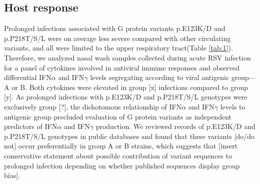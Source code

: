 \documentclass{article} %
\begin{document}
\subsection{Host response}
Prolonged infections associated with G protein variants p.E123K/D and p.P218T/S/L were on average less severe compared with other circulating variants, and all were limited to the upper respiratory tract(Table \ref{tab:1}). 
Therefore, we analyzed nasal wash samples collected during acute RSV infection for a panel of cytokines involved in antiviral immune responses and observed differential IFN$\alpha$ and IFN$\gamma$ levels segregating according to viral antigenic group—A or B.
Both cytokines were elevated in group [x] infections compared to group [y].
As prolonged infections with p.E123K/D and p.P218T/S/L genotypes were exclusively group [?], 
the dichotomous relationship of IFN$\alpha$ and IFN$\gamma$ levels to antigenic group precluded evaluation of G protein variants as independent predictors of IFN$\alpha$ and IFN$\gamma$ production. 
We reviewed records of p.E123K/D and p.P218T/S/L genotypes in public databases and found that these variants [do/do not] occur preferentially in group A or B strains, which suggests that [insert conservative statement about possible contribution of variant sequences to prolonged infection depending on whether published sequences display group bias].  

\end{document}
